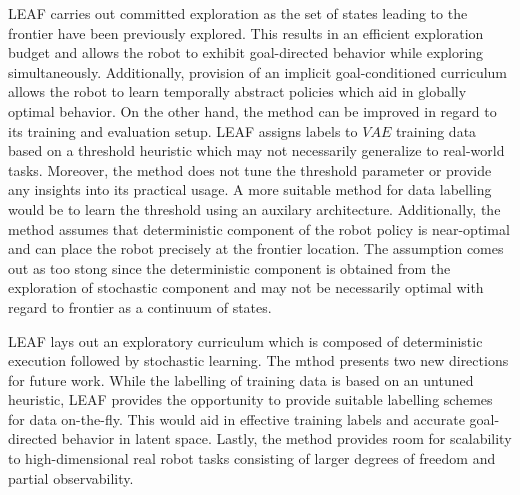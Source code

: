 \documentclass[11pt,letterpaper]{article}
\begin{document}
LEAF carries out committed exploration as the set of states leading to the frontier have been previously explored. This results in an efficient exploration budget and allows the robot to exhibit goal-directed behavior while exploring simultaneously. Additionally, provision of an implicit goal-conditioned curriculum allows the robot to learn temporally abstract policies which aid in globally optimal behavior. On the other hand, the method can be improved in regard to its training and evaluation setup. LEAF assigns labels to $VAE$ training data based on a threshold heuristic which may not necessarily generalize to real-world tasks. Moreover, the method does not tune the threshold parameter or provide any insights into its practical usage. A more suitable method for data labelling would be to learn the threshold using an auxilary architecture. Additionally, the method assumes that deterministic component of the robot policy is near-optimal and can place the robot precisely at the frontier location. The assumption comes out as too stong since the deterministic component is obtained from the exploration of stochastic component and may not be necessarily optimal with regard to frontier as a continuum of states. 

LEAF lays out an exploratory curriculum which is composed of deterministic execution followed by stochastic learning. The mthod presents two new directions for future work. While the labelling of training data is based on an untuned heuristic, LEAF provides the opportunity to provide suitable labelling schemes for data on-the-fly. This would aid in effective training labels and accurate goal-directed behavior in latent space. Lastly, the method provides room for scalability to high-dimensional real robot tasks consisting of larger degrees of freedom and partial observability. 
\end{document}
